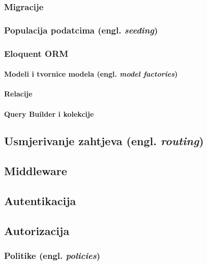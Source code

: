 \subsubsection{Migracije}

\subsubsection{Populacija podatcima (engl. \textit{seeding})}

\subsubsection{Eloquent ORM}

\paragraph{Modeli i tvornice modela (engl. \textit{model factories})}

\paragraph{Relacije}

\paragraph{Query Builder i kolekcije}

\subsection{Usmjerivanje zahtjeva (engl. \textit{routing})}

\subsection{Middleware}

\subsection{Autentikacija}

\subsection{Autorizacija}

\subsubsection{Politike (engl. \textit{policies})}


